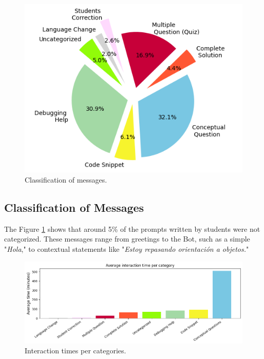 \documentclass[a4paper,twoside]{article}
\begin{document}
\begin{figure}[h!]
    \centering
    \includegraphics[scale=0.62]{img/figure1.png}
    \caption{Classification of messages.}
    \label{fig:graph1}
\end{figure}

\subsection{Classification of Messages}

The Figure \ref{fig:graph1} shows that around 5\% of the prompts
written by students were not categorized. These messages range from
greetings to the Bot, such as a simple "\textit{Hola}," to
contextual statements like "\textit{Estoy repasando orientación a
objetos.}"



\begin{figure}[htbp]
  \centering
  \includegraphics[scale=0.55]{img/figure3.png}
  \caption{Interaction times per categories.}
  \label{fig:graph3}
\end{figure}
\end{document}
